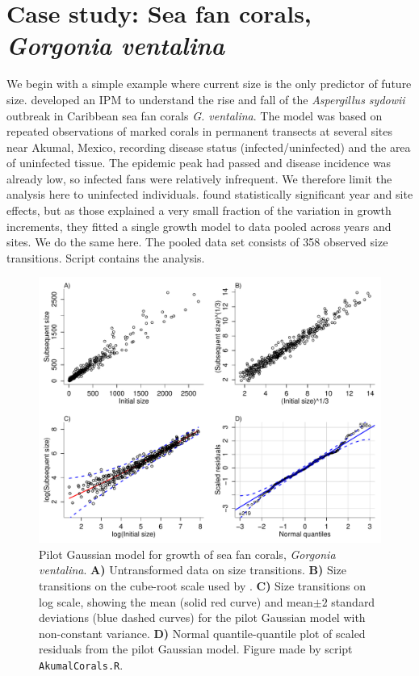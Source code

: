 \documentclass[11pt]{article}
\begin{document}
{\section{Case study: Sea fan corals, \emph{Gorgonia ventalina}}
We begin with a simple example where current size is the only predictor of future size. \cite{bruno-etal-2011} developed
an IPM to understand the rise and fall of the \emph{Aspergillus sydowii} outbreak in Caribbean sea fan corals 
\emph{G. ventalina}. The model was based on repeated observations of marked corals in permanent transects at several sites 
near Akumal, Mexico, recording disease status (infected/uninfected) and the area of uninfected tissue. 
The epidemic peak had passed and disease incidence was already low, so infected fans were relatively infrequent. 
We therefore limit the analysis here to uninfected individuals. \citet{bruno-et-al-2011} found statistically significant year
and site effects, but as those explained a very small fraction of the variation in growth increments, they fitted a single growth
model to data pooled across years and sites. We do the same here. The pooled data set consists of 358 observed
size transitions. Script  contains the analysis. 

\begin{figure}[tbp]
\centering
\includegraphics[width=\textwidth]{figures/AkumalPilot.pdf}
\caption{Pilot Gaussian model for growth of sea fan corals, \emph{Gorgonia ventalina}. \textbf{A)} Untransformed
data on size transitions. \textbf{B)} Size transitions on the cube-root scale used by \citet{bruno-etal-2011}. 
\textbf{C)} Size transitions on log scale, showing the mean (solid red curve) and mean$\pm 2$ standard deviations (blue dashed
curves) for the pilot Gaussian model with non-constant variance. \textbf{D)} Normal quantile-quantile plot of scaled residuals
from the pilot Gaussian model. Figure made by script \texttt{AkumalCorals.R}.}
\label{fig:AkumalPilot}
\end{figure} 

}
\end{document}
